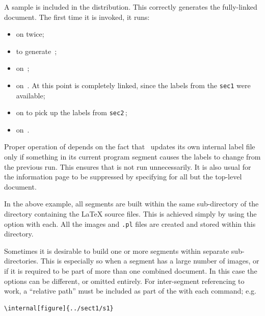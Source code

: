 \begin{changebar}
\medskip\htmlrule[width=300]
\html{\\}\noindent
A sample  is included in the distribution.
This correctly generates the fully-linked document.
The first time it is invoked, it runs:
\begin{itemize}
\item {} on  twice;
\item {} to generate \,;
\item {} on \,;
\item {} on \,.  
At this point  is completely linked, 
since the labels from the \texttt{sec1} were available;
\item {} on  to pick up the labels from \texttt{sec2}\,;
\item {} on \,.
\end{itemize}
Proper operation of  depends on the fact that
\latextohtml\ updates
its own internal label file only if something in its
current program segment causes the labels to change from the previous run.  
This ensures that \latextohtml{} is not run unnecessarily. 
It is also usual for the information page to be suppressed by specifying 
 for all but the top-level document.%
\end{changebar}

%
\begin{changebar}
In the above example, all segments are built within the same sub-directory
 of the directory containing the \LaTeX{} source files.
This is achieved simply by using the option  with each.
All the images and \texttt{.pl} files
are created and stored within this directory.

%
\html{\\}%
Sometimes it is desirable to build one or more segments within
separate sub-directories. 
This is especially so when a segment has a large number of images, 
or if it is required to be part of more than one combined document. 
In this case the  options can be different, 
or omitted entirely. For inter-segment referencing to work,
a ``relative path'' must be included as part of the 
with each  command; e.g.
\begin{verbatim}
\internal[figure]{../sect1/s1}
\end{verbatim}
\end{changebar}
%










